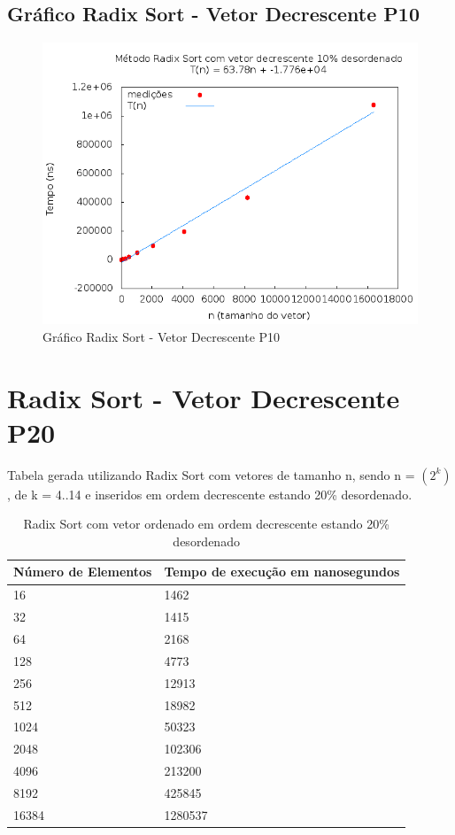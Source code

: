 \documentclass[12pt,a4paper,twoside]{report}
\begin{document}
\subsection{Gráfico Radix Sort - Vetor Decrescente P10}
\begin{figure}[H]
    \centering
    \includegraphics[width=0.7\linewidth]{graficos/RadixSort/vIntDecrescenteP10/vIntDecrescenteP10.png}
  \caption{Gráfico Radix Sort - Vetor Decrescente P10}
\end{figure}

\section{Radix Sort - Vetor Decrescente P20}
Tabela gerada utilizando Radix Sort com vetores de tamanho n, sendo n = $(2^k)$, de k = 4..14 e inseridos em ordem decrescente estando 20\% desordenado.
\begin{table}[H]
\centering
\caption{Radix Sort com vetor ordenado em ordem decrescente estando 20\% desordenado}
\label{my-label}
\begin{tabular}{|l|l|}
\hline
\multicolumn{1}{|c|}{\textbf{Número de Elementos}} & \multicolumn{1}{c|}{\textbf{Tempo de execução em nanosegundos}} \\ \hline
16 & 1462 \\ \hline
32 & 1415 \\ \hline
64 & 2168 \\ \hline
128 & 4773 \\ \hline
256 & 12913 \\ \hline
512 & 18982 \\ \hline
1024 & 50323 \\ \hline
2048 & 102306 \\ \hline
4096 & 213200 \\ \hline
8192 & 425845 \\ \hline
16384 & 1280537 \\ \hline
\end{tabular}
\end{table}
\end{document}
